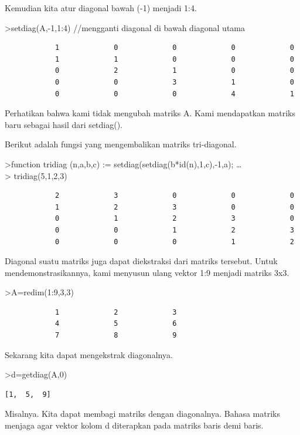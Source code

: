 \documentclass[
]{book}
\begin{document}
Kemudian kita atur diagonal bawah (-1) menjadi 1:4.

\textgreater setdiag(A,-1,1:4) //mengganti diagonal di bawah diagonal utama

\begin{verbatim}
            1             0             0             0             0 
            1             1             0             0             0 
            0             2             1             0             0 
            0             0             3             1             0 
            0             0             0             4             1 
\end{verbatim}

Perhatikan bahwa kami tidak mengubah matriks A. Kami mendapatkan matriks baru sebagai hasil dari setdiag().

Berikut adalah fungsi yang mengembalikan matriks tri-diagonal.

\textgreater function tridiag (n,a,b,c) := setdiag(setdiag(b*id(n),1,c),-1,a); \ldots{}\\
\textgreater{} tridiag(5,1,2,3)

\begin{verbatim}
            2             3             0             0             0 
            1             2             3             0             0 
            0             1             2             3             0 
            0             0             1             2             3 
            0             0             0             1             2 
\end{verbatim}

Diagonal suatu matriks juga dapat diekstraksi dari matriks tersebut. Untuk mendemonstrasikannya, kami menyusun ulang vektor 1:9 menjadi matriks 3x3.

\textgreater A=redim(1:9,3,3)

\begin{verbatim}
            1             2             3 
            4             5             6 
            7             8             9 
\end{verbatim}

Sekarang kita dapat mengekstrak diagonalnya.

\textgreater d=getdiag(A,0)

\begin{verbatim}
[1,  5,  9]
\end{verbatim}

Misalnya. Kita dapat membagi matriks dengan diagonalnya. Bahasa matriks menjaga agar vektor kolom d diterapkan pada matriks baris demi baris.
\end{document}
